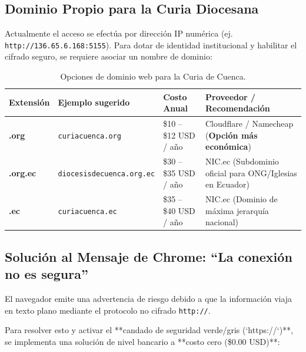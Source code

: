 \documentclass[11pt,a4paper]{article}
\begin{document}
\subsection{Dominio Propio para la Curia Diocesana}
Actualmente el acceso se efectúa por dirección IP numérica (ej. \texttt{http://136.65.6.168:5155}). Para dotar de identidad institucional y habilitar el cifrado seguro, se requiere asociar un nombre de dominio:

\begin{table}[h!]
\centering
\small
\begin{tabularx}{\textwidth}{l p{4.2cm} l p{4.8cm}}
\toprule
\textbf{Extensión} & \textbf{Ejemplo sugerido} & \textbf{Costo Anual} & \textbf{Proveedor / Recomendación} \\
\midrule
\textbf{.org} & \texttt{curiacuenca.org} & \$10 -- \$12 USD / año & Cloudflare / Namecheap (\textbf{Opción más económica}) \\
\textbf{.org.ec} & \texttt{diocesisdecuenca.org.ec} & \$30 -- \$35 USD / año & NIC.ec (Subdominio oficial para ONG/Iglesias en Ecuador) \\
\textbf{.ec} & \texttt{curiacuenca.ec} & \$35 -- \$40 USD / año & NIC.ec (Dominio de máxima jerarquía nacional) \\
\bottomrule
\end{tabularx}
\caption{Opciones de dominio web para la Curia de Cuenca.}
\end{table}

\subsection{Solución al Mensaje de Chrome: ``La conexión no es segura''}
El navegador emite una advertencia de riesgo debido a que la información viaja en texto plano mediante el protocolo no cifrado \texttt{http://}.

Para resolver esto y activar el **candado de seguridad verde/gris (`https://`)**, se implementa una solución de nivel bancario a **costo cero (\$0.00 USD)**:
\end{document}
